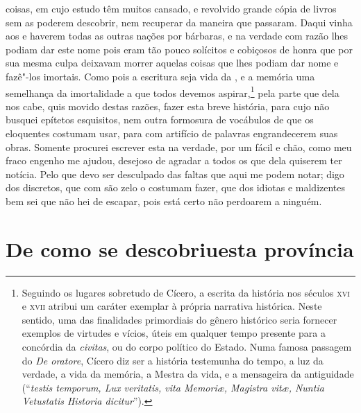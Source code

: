 coisas, em cujo estudo têm muitos  cansado, e revolvido
grande cópia de livros sem as poderem descobrir, nem recuperar da
maneira que passaram. Daqui vinha aos  e  haverem todas as
outras nações por bárbaras, e na verdade com razão lhes podiam dar este			%
nome pois eram tão pouco solícitos e cobiçosos de honra que por sua
mesma culpa deixavam morrer aquelas coisas que lhes podiam dar nome e
fazê"-los imortais. Como pois a escritura seja vida da , e a
memória uma semelhança da imortalidade a que todos devemos
aspirar,\footnote{ Seguindo os lugares sobretudo de Cícero, a escrita da
história nos séculos \textsc{xvi} e \textsc{xvii} atribui um caráter exemplar à própria
narrativa histórica. Neste sentido, uma das finalidades primordiais do
gênero histórico seria fornecer exemplos de virtudes e vícios, úteis em
qualquer tempo presente para a concórdia da \textit{civitas}, ou do corpo
político do Estado. Numa famosa passagem do \textit{De oratore}, 
Cícero diz ser a história testemunha do tempo, a luz da verdade, a vida
da memória, a Mestra da vida, e a mensageira da antiguidade (``\textit{testis
temporum, Lux veritatis, vita Memori\ae, Magistra vit\ae, Nuntia
Vetustatis Historia dicitur}'').} pela parte que dela nos cabe, quis
movido destas razões, fazer esta breve história, para cujo 
não busquei epítetos esquisitos, nem outra formosura de vocábulos de
que os eloquentes  costumam usar, para com artifício de
palavras engrandecerem suas obras. Somente procurei escrever esta na
verdade, por um  fácil e chão, como meu fraco engenho me ajudou,       %
desejoso de agradar a todos os que dela quiserem ter notícia. Pelo que
devo ser desculpado das faltas que aqui me podem notar; digo dos
discretos, que com são zelo o costumam fazer, que dos idiotas e
maldizentes bem sei que não hei de escapar, pois está certo não perdoarem a ninguém.


\chapter[De como se descobriu esta província]{De como se
descobriu\break esta província}							%

